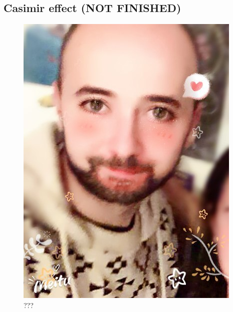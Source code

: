 	\subsection{Casimir effect (NOT FINISHED)} 
\begin{figure}
		\centering
		\includegraphics[width=0.4\linewidth]{fig/L1/tWo-qqZjraA}
		\caption{???}		
	\end{figure}
	